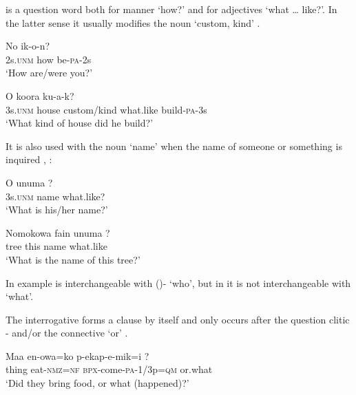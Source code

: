  is a question word both for manner `how?'  and for adjectives `what {\dots} like?'. In the latter sense it usually modifies the noun  `custom, kind' .

\ea%
\label{ex:3:x527}
\gll No  ik-o-n? \\
2s.\textsc{unm} how be-\textsc{pa}-2s\\
\glt`How are/were you?'
\z

\ea%
\label{ex:3:x528}
\gll O koora   ku-a-k? \\
3s.\textsc{unm} house custom/kind what.like build-\textsc{pa}-3s\\
\glt`What kind of house did he build?'
\z

It is also used with the noun  `name' when the name of someone or something is inquired , :

\ea%
\label{ex:3:x650}
\gll O unuma ? \\
3s.\textsc{unm} name what.like?\\
\glt`What is his/her name?'
\z

\ea%
\label{ex:3:x651}
\gll Nomokowa fain unuma ? \\
tree this name what.like\\
\glt`What is the name of this tree?'
\z

In example   is interchangeable with ()- `who', but in  it is not interchangeable with  `what'.

The interrogative  forms a clause by itself and only occurs after the question clitic - and/or the connective  `or' . 

\ea%
\label{ex:3:x529}
\gll Maa en-owa=ko p-ekap-e-mik=i ? \\
thing eat-\textsc{nmz}=\textsc{nf} \textsc{bpx}-come-\textsc{pa}-1/3p=\textsc{qm} or.what\\
\glt`Did they bring food, or what (happened)?'
\z

